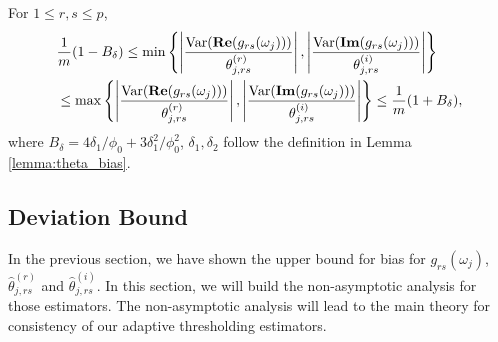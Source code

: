 \begin{lem}
For $1\le r, s\le p$, 
\label{lemma: variance_ratio_error}
\begin{equation}
\begin{aligned}
& \frac{1}{m}(1-B_\delta) \le \min\left\{\left|\frac{\mathrm{Var}({\bf Re}(g_{rs}(\omega_j)))}{\theta^{(r)}_{j, rs}}\right|, \left|\frac{\mathrm{Var}({\bf Im}(g_{rs}(\omega_j)))}{\theta^{(i)}_{j, rs}}\right|\right\}\\
& \le \max\left\{\left|\frac{\mathrm{Var}({\bf Re}(g_{rs}(\omega_j)))}{\theta^{(r)}_{j, rs}}\right|, \left|\frac{\mathrm{Var}({\bf Im}(g_{rs}(\omega_j)))}{\theta^{(i)}_{j, rs}}\right|\right\} \le \frac{1}{m}(1+B_\delta),
\end{aligned}
\end{equation}
where $B_\delta = 4\delta_1/\phi_0 + 3\delta_1^2/\phi_0^2$, $\delta_1, \delta_2$ follow the definition in Lemma \ref{lemma:theta_bias}. 
\end{lem}


\subsection{Deviation Bound} 
In the previous section,  we have shown the upper bound for bias for $g_{rs}(\omega_j)$, $\hat{\theta}^{(r)}_{j, rs}$ and $\hat{\theta}^{(i)}_{j, rs}$. In this section, we will build the non-asymptotic analysis for those estimators. The non-asymptotic analysis will lead to the
main theory for consistency of our adaptive thresholding estimators. 


